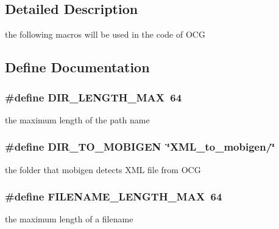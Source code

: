 \subsection{Detailed Description}
the following macros will be used in the code of OCG 

\subsection{Define Documentation}
\subsubsection[{DIR\_\-LENGTH\_\-MAX}]{\setlength{\rightskip}{0pt plus 5cm}\#define DIR\_\-LENGTH\_\-MAX~64}\label{group____useful__macro_g76232523706a1adf8f7e6b428912222b}


the maximum length of the path name 

\subsubsection[{DIR\_\-TO\_\-MOBIGEN}]{\setlength{\rightskip}{0pt plus 5cm}\#define DIR\_\-TO\_\-MOBIGEN~\char`\"{}XML\_\-to\_\-mobigen/\char`\"{}}\label{group____useful__macro_gba0dbe151f36dbb5a1e9d6a014a6e4bc}


the folder that mobigen detects XML file from OCG 

\subsubsection[{FILENAME\_\-LENGTH\_\-MAX}]{\setlength{\rightskip}{0pt plus 5cm}\#define FILENAME\_\-LENGTH\_\-MAX~64}\label{group____useful__macro_g367ba81f78d6fb6a2f0269fa891459ed}


the maximum length of a filename 

